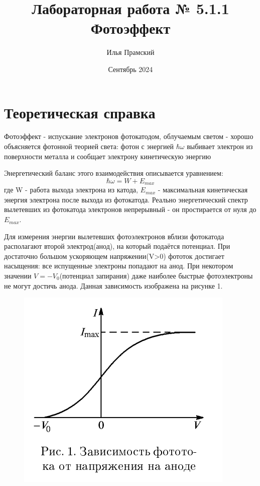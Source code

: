 \documentclass[a4paper,12pt]{article}
\title{Лабораторная работа № 5.1.1\\Фотоэффект}
\author{Илья Прамский}
\date{Сентябрь 2024}
\begin{document}
\maketitle
\newpage
\section{Теоретическая справка}
Фотоэффект - испускание электронов фотокатодом, облучаемым светом - хорошо объясняется фотонной теорией света: фотон с энергией $\hbar \omega$ выбивает электрон из поверхности металла и сообщает электрону кинетическую энергию

Энергетический баланс этого взаимодействия описывается уравнением:
\begin{equation}
\hbar \omega = W + E_{max}
\end{equation}
где W - работа выхода электрона из катода, $E_{max}$ - максимальная кинетическая энергия электрона после выхода из фотокатода. Реально энергетический спектр вылетевших из фотокатода электронов непрерывный - он простирается от нуля до $E_{max}$.

Для измерения энергии вылетевших фотоэлектронов вблизи фотокатода располагают второй электрод(анод), на который подаётся потенциал. При достаточно большом ускоряющем напряжении(V>0) фототок достигает насыщения: все испущенные электроны попадают на анод. При некотором значении $V = -V_0$(потенциал запирания) даже наиболее быстрые фотоэлектроны не могут достичь анода. Данная зависимость изображена на рисунке 1.

\begin{figure}[H]
\centering
\includegraphics[scale=0.7]{ris1.png}
\end{figure}
\end{document}
